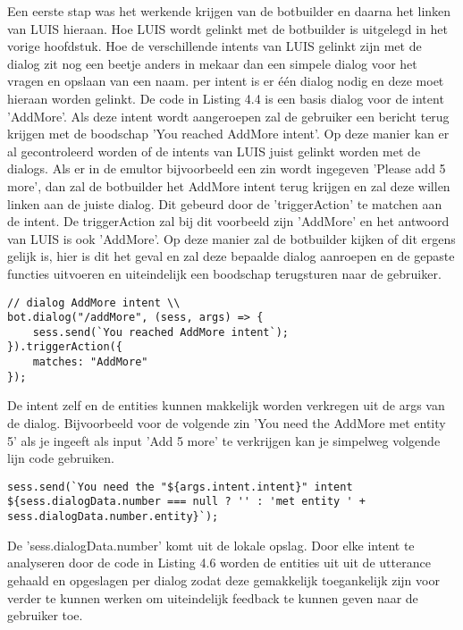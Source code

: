 Een eerste stap was het werkende krijgen van de botbuilder en daarna het linken van LUIS hieraan. Hoe LUIS wordt gelinkt met de botbuilder is uitgelegd in het vorige hoofdstuk. Hoe de verschillende intents van LUIS gelinkt zijn met de dialog zit nog een beetje anders in mekaar dan een simpele dialog voor het vragen en opslaan van een naam. per intent is er één dialog nodig en deze moet hieraan worden gelinkt. De code in Listing 4.4 is een basis dialog voor de intent 'AddMore'. Als deze intent wordt aangeroepen zal de gebruiker een bericht terug krijgen met de boodschap 'You reached AddMore intent'. Op deze manier kan er al gecontroleerd worden of de intents van LUIS juist gelinkt worden met de dialogs. Als er in de emultor bijvoorbeeld een zin wordt ingegeven 'Please add 5 more', dan zal de botbuilder het AddMore intent terug krijgen en zal deze willen linken aan de juiste dialog. Dit gebeurd door de 'triggerAction' te matchen aan de intent. De triggerAction zal bij dit voorbeeld zijn 'AddMore' en het antwoord van LUIS is ook 'AddMore'. Op deze manier zal de botbuilder kijken of dit ergens gelijk is, hier is dit het geval en zal deze bepaalde dialog aanroepen en de gepaste functies uitvoeren en uiteindelijk een boodschap terugsturen naar de gebruiker.

\medskip
\begin{lstlisting}[caption=Waterval methode]
// dialog AddMore intent \\
bot.dialog("/addMore", (sess, args) => {
	sess.send(`You reached AddMore intent`);
}).triggerAction({
	matches: "AddMore"
});
\end{lstlisting}

De intent zelf en de entities kunnen makkelijk worden verkregen uit de args van de dialog. Bijvoorbeeld voor de volgende zin 'You need the AddMore met entity 5' als je ingeeft als input 'Add 5 more' te verkrijgen kan je simpelweg volgende lijn code gebruiken.

\medskip
\begin{lstlisting}[caption=gebruiken van args]
sess.send(`You need the "${args.intent.intent}" intent ${sess.dialogData.number === null ? '' : 'met entity ' + sess.dialogData.number.entity}`);
\end{lstlisting}

De 'sess.dialogData.number' komt uit de lokale opslag. Door elke intent te analyseren door de code in Listing 4.6 worden de entities uit uit de utterance gehaald en opgeslagen per dialog zodat deze gemakkelijk toegankelijk zijn voor verder te kunnen werken om uiteindelijk feedback te kunnen geven naar de gebruiker toe. 

